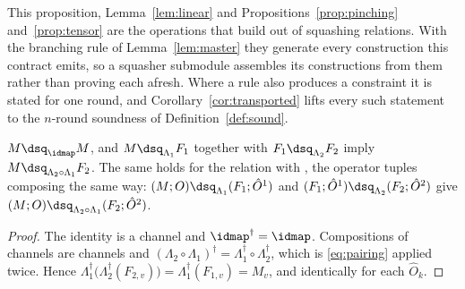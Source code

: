 
This proposition, Lemma~\ref{lem:linear} and Propositions~\ref{prop:pinching}
and~\ref{prop:tensor} are the operations that build
 out of squashing relations. With the branching rule of Lemma~\ref{lem:master}
they generate every construction this contract emits, so a squasher
submodule assembles its constructions from them rather than proving each
afresh. Where a rule also produces a constraint it is stated for one round,
and Corollary~\ref{cor:transported} lifts every such statement to the
$n$-round soundness of Definition~\ref{def:sound}.

\begin{proposition}\label{prop:preorder}
$M\dsq_{\idmap}M$, and $M\dsq_{\Lambda_1}F_1$ together with
$F_1\dsq_{\Lambda_2}F_2$ imply $M\dsq_{\Lambda_2\circ\Lambda_1}F_2$. The same
holds for the relation with , the operator tuples
composing the same way: $(M;O)\dsq_{\Lambda_1}(F_1;\hat O^{1})$ and
$(F_1;\hat O^{1})\dsq_{\Lambda_2}(F_2;\hat O^{2})$ give
$(M;O)\dsq_{\Lambda_2\circ\Lambda_1}(F_2;\hat O^{2})$.
\end{proposition}

\begin{proof}
The identity is a channel and $\idmap^{\dagger}=\idmap$. Compositions of
channels are channels and
$(\Lambda_2\circ\Lambda_1)^{\dagger}=\Lambda_1^{\dagger}\circ
\Lambda_2^{\dagger}$, which is \eqref{eq:pairing} applied twice. Hence
$\Lambda_1^{\dagger}\big(\Lambda_2^{\dagger}(F_{2,v})\big)
=\Lambda_1^{\dagger}(F_{1,v})=M_v$, and identically for each $\hat O_k$.
\end{proof}
